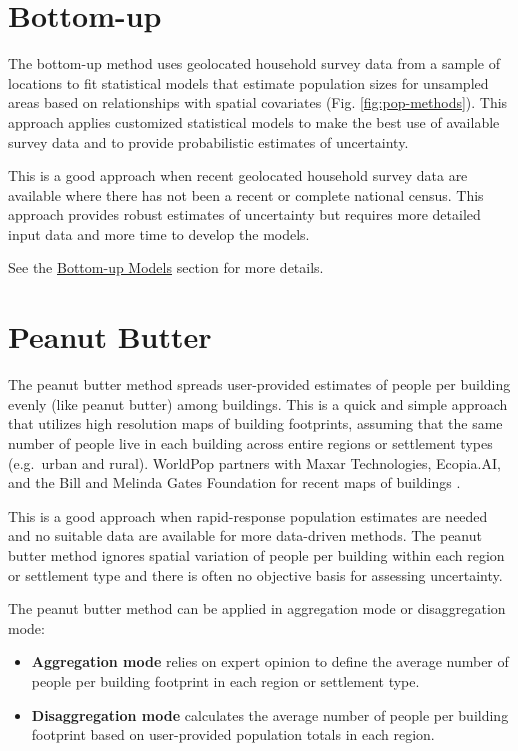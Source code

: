 \documentclass[]{book}
\begin{document}
\section{Bottom-up}\label{bottom-up}

The bottom-up method \citep{wardrop2018spatially, leasure2020national}
uses geolocated household survey data from a sample of locations to fit
statistical models that estimate population sizes for unsampled areas
based on relationships with spatial covariates (Fig.
\ref{fig:pop-methods}). This approach applies customized statistical
models to make the best use of available survey data and to provide
probabilistic estimates of uncertainty.

This is a good approach when recent geolocated household survey data are
available where there has not been a recent or complete national census.
This approach provides robust estimates of uncertainty but requires more
detailed input data and more time to develop the models.

See the \protect\hyperlink{bottom-up-models}{Bottom-up Models} section
for more details.

\section{Peanut Butter}\label{peanut-butter}

The peanut butter method spreads user-provided estimates of people per
building evenly (like peanut butter) among buildings. This is a quick
and simple approach that utilizes high resolution maps of building
footprints, assuming that the same number of people live in each
building across entire regions or settlement types (e.g.~urban and
rural). WorldPop partners with Maxar Technologies, Ecopia.AI, and the
Bill and Melinda Gates Foundation for recent maps of buildings
\citep[\citet{dooley2020gridded}]{ecopia2020digitize}.

This is a good approach when rapid-response population estimates are
needed and no suitable data are available for more data-driven methods.
The peanut butter method ignores spatial variation of people per
building within each region or settlement type and there is often no
objective basis for assessing uncertainty.

The peanut butter method can be applied in aggregation mode or
disaggregation mode:

\begin{itemize}
\item
  \textbf{Aggregation mode} relies on expert opinion to define the
  average number of people per building footprint in each region or
  settlement type.
\item
  \textbf{Disaggregation mode} calculates the average number of people
  per building footprint based on user-provided population totals in
  each region.
\end{itemize}
\end{document}

